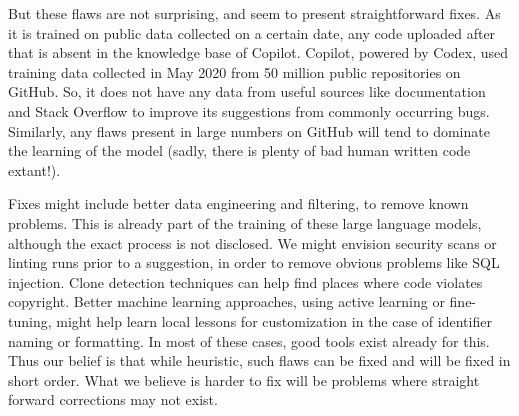 But these flaws are not surprising, and seem to present straightforward fixes.
As it is trained on public data collected on a certain date, any code uploaded after that is absent in the knowledge base of Copilot. Copilot, powered by Codex, used training data collected in May 2020 from 50 million public repositories on GitHub\cite{copilot}. So, it does not have any data from useful sources like documentation and Stack Overflow to improve its suggestions from commonly occurring bugs.
Similarly, any flaws present in large numbers on GitHub will tend to dominate the learning of the model (sadly, there is plenty of bad human written code extant!).

Fixes might include better data engineering and filtering, to remove known problems. This is already part of the training of these large language models, although the exact process is not disclosed. 
We might envision security scans or linting runs prior to a suggestion, in order to remove obvious problems like SQL injection. 
Clone detection techniques can help find places where code violates copyright. 
Better machine learning approaches, using active learning or fine-tuning, might help learn local lessons \cite{tim} for customization in the case of identifier naming or formatting.
In most of these cases, good tools exist already for this. 
Thus our belief is that while heuristic, such flaws can be fixed and will be fixed in short order. What we believe is harder to fix will be problems where straight forward corrections may not exist.
